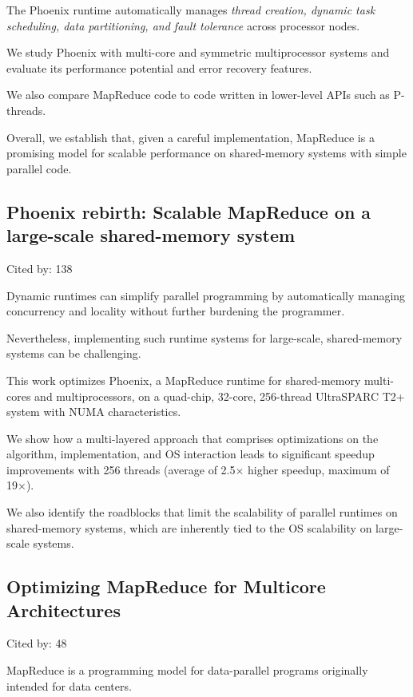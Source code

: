 \documentclass[a4paper,11pt]{article}
\begin{document}
{{{The Phoenix runtime automatically manages 
{\em thread creation,  dynamic task scheduling, data partitioning, and fault tolerance}
across processor nodes. 

We 
study Phoenix with multi-core and symmetric multiprocessor systems and 
evaluate its performance potential and error recovery features. 

We also compare MapReduce code to code written in lower-level APIs such as P-threads. 

Overall, we establish that, given a careful implementation, 
MapReduce is a promising model for scalable performance on shared-memory systems 
with simple parallel code.

}

\subsection*{Phoenix rebirth: Scalable MapReduce on a large-scale shared-memory system}
{\color{cyan} {\color{magenta} Cited by: 138}

Dynamic runtimes can simplify parallel programming 
by automatically managing concurrency and locality without further burdening the programmer. 

Nevertheless, 
implementing such runtime systems for large-scale, shared-memory systems can be challenging. 

This work 
{\color{black} optimizes Phoenix\cite{phoenix09}}, 
a MapReduce runtime for shared-memory multi-cores and multiprocessors, 
on a quad-chip, 32-core, 256-thread UltraSPARC T2+ system with NUMA characteristics. 

We show 
how a multi-layered approach that comprises optimizations 
on the algorithm, implementation, and OS interaction 
leads to significant speedup improvements 
with 256 threads (average of 2.5× higher speedup, maximum of 19×).

We also identify the roadblocks that limit the scalability of parallel runtimes on shared-memory systems, 
which are inherently tied to the OS scalability on large-scale systems.

}

\subsection*{Optimizing MapReduce for Multicore Architectures}
{\color{cyan} {\color{magenta} Cited by: 48}

MapReduce is a programming model for data-parallel programs originally intended for data centers. 

}}}
\end{document}
